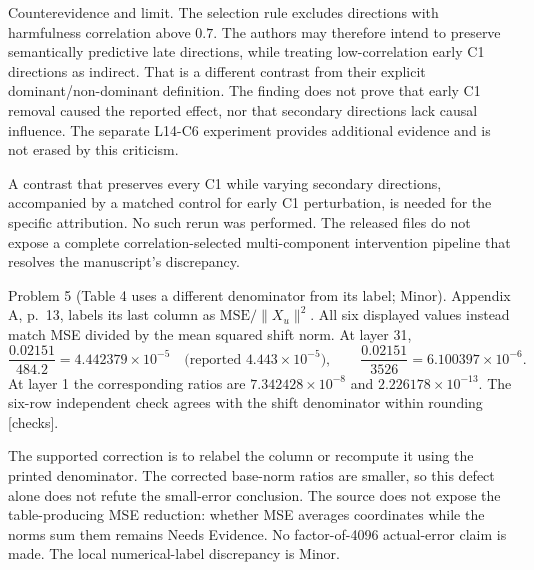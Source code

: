\documentclass[10pt]{article}
\begin{document}
Counterevidence and limit. The selection rule excludes directions with harmfulness correlation above \(0.7\). The authors may therefore intend to preserve semantically predictive late directions, while treating low-correlation early C1 directions as indirect. That is a different contrast from their explicit dominant/non-dominant definition. The finding does not prove that early C1 removal caused the reported effect, nor that secondary directions lack causal influence. The separate L14-C6 experiment provides additional evidence and is not erased by this criticism.\par
A contrast that preserves every C1 while varying secondary directions, accompanied by a matched control for early C1 perturbation, is needed for the specific attribution. No such rerun was performed. The released files do not expose a complete correlation-selected multi-component intervention pipeline that resolves the manuscript’s discrepancy.\par
Problem 5 (Table 4 uses a different denominator from its label; Minor).  Appendix A, p. 13, labels its last column as \(\mathrm{MSE}/\|X_u\|^2\). All six displayed values instead match MSE divided by the mean squared shift norm. At layer 31, \[\frac{0.02151}{484.2}=4.442379\times10^{-5}
\quad\text{(reported }4.443\times10^{-5}\text{)},\qquad
\frac{0.02151}{3526}=6.100397\times10^{-6}.\] At layer 1 the corresponding ratios are \(7.342428\times10^{-8}\) and \(2.226178\times10^{-13}\). The six-row independent check agrees with the shift denominator within rounding [checks].\par
The supported correction is to relabel the column or recompute it using the printed denominator. The corrected base-norm ratios are smaller, so this defect alone does not refute the small-error conclusion. The source does not expose the table-producing MSE reduction: whether MSE averages coordinates while the norms sum them remains Needs Evidence. No factor-of-4096 actual-error claim is made. The local numerical-label discrepancy is Minor.\par
\end{document}
